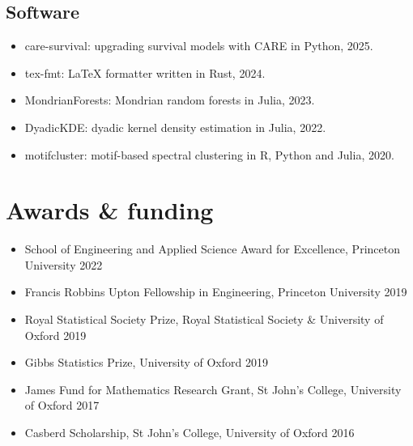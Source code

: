 \documentclass{wgu-cv}
\begin{document}
\subsection{Software}{}
\begin{itemize}

  \item care-survival: upgrading survival models with CARE in Python, 2025. \\

  \item tex-fmt: LaTeX formatter written in Rust, 2024.

  \item MondrianForests: Mondrian random forests in Julia, 2023. \\

  \item DyadicKDE: dyadic kernel density estimation in Julia, 2022. \\

  \item motifcluster: motif-based spectral clustering
    in R, Python and Julia, 2020. \\

\end{itemize}

\pagebreak

\section{Awards \& funding}
\vspace{-0.22cm}

\begin{itemize}
  \item School of Engineering and Applied Science Award for Excellence,
    Princeton University
    \hfill 2022%
  \item Francis Robbins Upton Fellowship in Engineering,
    Princeton University
    \hfill 2019%
  \item Royal Statistical Society Prize,
    Royal Statistical Society \& University of Oxford
    \hfill 2019%
  \item Gibbs Statistics Prize,
    University of Oxford
    \hfill 2019%
  \item James Fund for Mathematics Research Grant,
    St John's College, University of Oxford
    \hfill 2017%
  \item Casberd Scholarship,
    St John's College, University of Oxford
    \hfill 2016%
\end{itemize}
\end{document}
